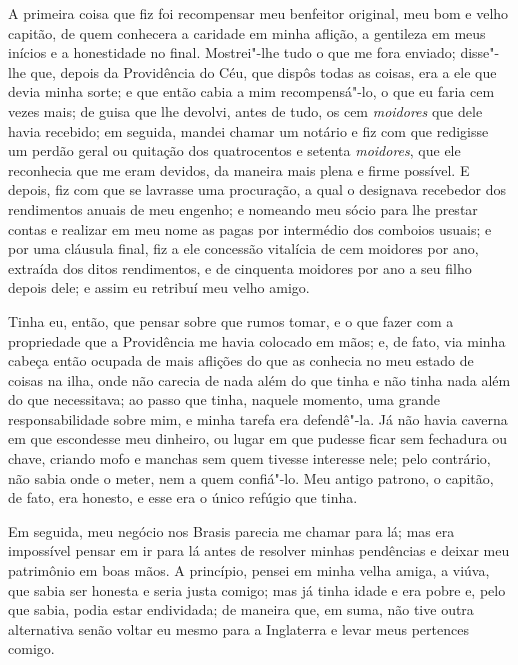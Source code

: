 A primeira coisa que fiz foi recompensar meu benfeitor original, meu bom
e velho capitão, de quem conhecera a caridade em minha aflição, a
gentileza em meus inícios e a honestidade no final. Mostrei"-lhe tudo o
que me fora enviado; disse"-lhe que, depois da Providência do Céu, que
dispôs todas as coisas, era a ele que devia minha sorte; e que então
cabia a mim recompensá"-lo, o que eu faria cem vezes mais; de guisa que
lhe devolvi, antes de tudo, os cem \emph{moidores} que dele havia
recebido; em seguida, mandei chamar um notário e fiz com que redigisse
um perdão geral ou quitação dos quatrocentos e setenta \emph{moidores},
que ele reconhecia que me eram devidos, da maneira mais plena e firme
possível. E depois, fiz com que se lavrasse uma procuração, a qual o
designava recebedor dos rendimentos anuais de meu engenho; e nomeando
meu sócio para lhe prestar contas e realizar em meu nome as pagas por
intermédio dos comboios usuais; e por uma cláusula final, fiz a ele
concessão vitalícia de cem moidores por ano, extraída dos ditos
rendimentos, e de cinquenta moidores por ano a seu filho depois dele; e
assim eu retribuí meu velho amigo.

Tinha eu, então, que pensar sobre que rumos tomar, e o que fazer com a
propriedade que a Providência me havia colocado em mãos; e, de fato, via
minha cabeça então ocupada de mais aflições do que as conhecia no meu
estado de coisas na ilha, onde não carecia de nada além do que tinha e
não tinha nada além do que necessitava; ao passo que tinha, naquele
momento, uma grande responsabilidade sobre mim, e minha tarefa era
defendê"-la. Já não havia caverna em que escondesse meu dinheiro, ou
lugar em que pudesse ficar sem fechadura ou chave, criando mofo e
manchas sem quem tivesse interesse nele; pelo contrário, não sabia onde
o meter, nem a quem confiá"-lo. Meu antigo patrono, o capitão, de fato,
era honesto, e esse era o único refúgio que tinha.

Em seguida, meu negócio nos Brasis parecia me chamar para lá; mas era
impossível pensar em ir para lá antes de resolver minhas pendências e
deixar meu patrimônio em boas mãos. A princípio, pensei em minha velha
amiga, a viúva, que sabia ser honesta e seria justa comigo; mas já tinha
idade e era pobre e, pelo que sabia, podia estar endividada; de maneira
que, em suma, não tive outra alternativa senão voltar eu mesmo para a
Inglaterra e levar meus pertences comigo.

